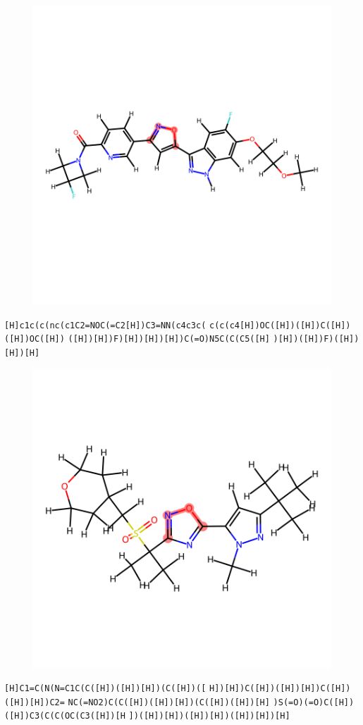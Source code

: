 \documentclass{article}
\begin{document}
\begin{figure}[ht]
\centering
    \includegraphics{mol36.png}
\end{figure}
\verb|[H]c1c(c(nc(c1C2=NOC(=C2[H])C3=NN(c4c3c(| \verb|c(c(c4[H])OC([H])([H])C([H])([H])OC([H])| \verb|([H])[H])F)[H])[H])[H])C(=O)N5C(C(C5([H]| \verb|)[H])([H])F)([H])[H])[H]|

\begin{figure}[ht]
\centering
    \includegraphics{mol37.png}
\end{figure}
\verb|[H]C1=C(N(N=C1C(C([H])([H])[H])(C([H])([| \verb|H])[H])C([H])([H])[H])C([H])([H])[H])C2=| \verb|NC(=NO2)C(C([H])([H])[H])(C([H])([H])[H]| \verb|)S(=O)(=O)C([H])([H])C3(C(C(OC(C3([H])[H| \verb|])([H])[H])([H])[H])([H])[H])[H]|
\end{document}

